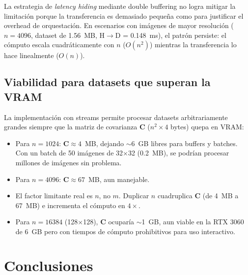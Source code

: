 \documentclass[12pt,a4paper]{article}
\begin{document}
La estrategia de \textit{latency hiding} mediante double buffering no logra mitigar
la limitación porque la transferencia es demasiado peque\~na como para justificar
el overhead de orquestación. En escenarios con imágenes de mayor resolución
($n=4096$, dataset de 1.56~MB, H$\rightarrow$D = 0.148~ms), el patrón persiste:
el cómputo escala cuadráticamente con $n$ ($O(n^2)$) mientras la transferencia
lo hace linealmente ($O(n)$).

\subsection{Viabilidad para datasets que superan la VRAM}

La implementación con streams permite procesar datasets arbitrariamente grandes
siempre que la matriz de covarianza $\mathbf{C}$ ($n^2 \times 4$ bytes) quepa en VRAM:

\begin{itemize}
    \item Para $n=1024$: $\mathbf{C} \approx 4$~MB, dejando $\sim$6~GB libres para
          buffers y batches. Con un batch de 50 imágenes de 32$\times$32 (0.2~MB),
          se podrían procesar millones de imágenes sin problema.
    \item Para $n=4096$: $\mathbf{C} \approx 67$~MB, aun manejable.
    \item El factor limitante real es $n$, no $m$. Duplicar $n$ cuadruplica
          $\mathbf{C}$ (de 4~MB a 67~MB) e incrementa el cómputo en $4\times$.
    \item Para $n=16384$ (128$\times$128), $\mathbf{C}$ ocuparía $\sim$1~GB,
          aun viable en la RTX 3060 de 6~GB pero con tiempos de cómputo
          prohibitivos para uso interactivo.
\end{itemize}

\section{Conclusiones}
\end{document}
